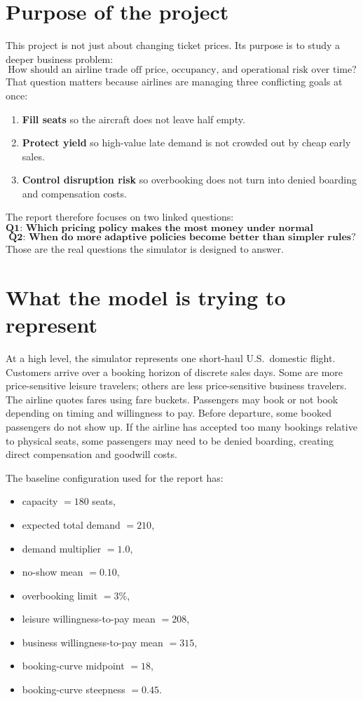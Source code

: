 \documentclass[11pt,a4paper]{article}
\begin{document}
\section{Purpose of the project}

This project is not just about changing ticket prices. Its purpose is to study a deeper business problem:
\[
\text{How should an airline trade off price, occupancy, and operational risk over time?}
\]
That question matters because airlines are managing three conflicting goals at once:
\begin{enumerate}
  \item \textbf{Fill seats} so the aircraft does not leave half empty.
  \item \textbf{Protect yield} so high-value late demand is not crowded out by cheap early sales.
  \item \textbf{Control disruption risk} so overbooking does not turn into denied boarding and compensation costs.
\end{enumerate}

The report therefore focuses on two linked questions:
\[
\textbf{Q1: Which pricing policy makes the most money under normal conditions?}
\]
\[
\textbf{Q2: When do more adaptive policies become better than simpler rules?}
\]
Those are the real questions the simulator is designed to answer.

\section{What the model is trying to represent}

At a high level, the simulator represents one short-haul U.S.\ domestic flight. Customers arrive over a booking horizon of discrete sales days. Some are more price-sensitive leisure travelers; others are less price-sensitive business travelers. The airline quotes fares using fare buckets. Passengers may book or not book depending on timing and willingness to pay. Before departure, some booked passengers do not show up. If the airline has accepted too many bookings relative to physical seats, some passengers may need to be denied boarding, creating direct compensation and goodwill costs.

The baseline configuration used for the report has:
\begin{itemize}
  \item capacity $= 180$ seats,
  \item expected total demand $= 210$,
  \item demand multiplier $= 1.0$,
  \item no-show mean $= 0.10$,
  \item overbooking limit $= 3\%$,
  \item leisure willingness-to-pay mean $= 208$,
  \item business willingness-to-pay mean $= 315$,
  \item booking-curve midpoint $= 18$,
  \item booking-curve steepness $= 0.45$.
\end{itemize}
\end{document}
